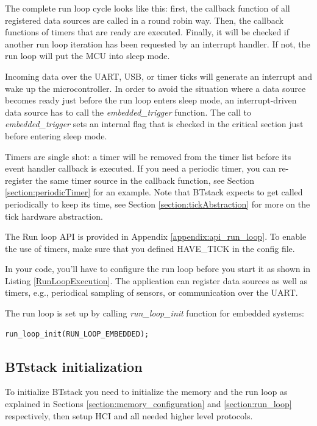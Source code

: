 \documentclass[a4paper,titlepage,oneside,12pt]{amsart} %
\begin{document}
The complete run loop cycle looks like this: first, the callback function of all registered data sources are called in a round robin way. Then, the callback functions of timers that are ready are executed. Finally, it will be checked if another run loop iteration has been requested by an interrupt handler. If not, the run loop will put the MCU into sleep mode.

Incoming data over the UART, USB, or timer ticks will generate an interrupt and wake up the microcontroller. In order to avoid the situation where a data source becomes ready just before the run loop enters sleep mode, an interrupt-driven data source has to call the \emph{embedded\_trigger} function. The call to \emph{embedded\_trigger} sets an internal flag that is checked in the critical section just before entering sleep mode. 

Timers are single shot: a timer will be removed from the timer list before its event handler callback is executed. If you need a periodic timer, you can re-register the same timer source in the callback function, see Section \ref{section:periodicTimer} for an example. Note that BTstack expects to get called periodically to keep its time, see Section \ref{section:tickAbstraction} for more on the tick hardware abstraction. 

The Run loop API is provided in Appendix \ref{appendix:api_run_loop}. To enable the use of timers, make sure that you defined HAVE\_TICK in the config file.

In your code, you'll have to configure the run loop before you start it as shown in Listing \ref{RunLoopExecution}. The application can register data sources as well as timers, e.g., periodical sampling of sensors, or communication over the UART.

The run loop is set up by calling \emph{run\_loop\_init} function for embedded systems:
\begin{lstlisting}
run_loop_init(RUN_LOOP_EMBEDDED);
\end{lstlisting}


\subsection{BTstack initialization}
\label{section:btstack_initialization}
To initialize BTstack you need to initialize the memory and the run loop as explained in Sections \ref{section:memory_configuration} and \ref{section:run_loop} respectively, then setup HCI and all needed higher level protocols.
\end{document}
